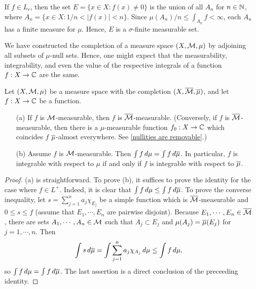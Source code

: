 \begin{obs}
    If $f\in L_c$, then the set $E=\{x\in X: f(x)\neq 0\}$ is the union of all $A_n$ for $n\in{\mathbb{N}}$, where $A_n=\{x\in X: 1/n<|f(x)|<n\}$.
    Since $\mu(A_n)/n\leq\int_{A_n} f<\infty$, each $A_n$ has a finite measure for $\mu$.
    Hence, $E$ is a $\sigma$-finite measurable set.
\end{obs}

We have constructed the completion of a measure space $(X, {\mathcal{M}}, \mu)$ by adjoining all subsets of $\mu$-null sets.
Hence, one might expect that the measurability, integrability, and even the value of the respective integrals of a function $f: X\rightarrow{\mathbb{C}}$ are the same.
\begin{lem}\label{integral w.r.t. a measure and its completion}
    Let $(X, {\mathcal{M}}, \mu)$ be a measure space with the completion $(X, \overline{{\mathcal{M}}}, \overline{\mu})$, and let $f: X\rightarrow{\mathbb{C}}$ be a function.
    \begin{enumerate}
        \item[(a)]
        {
            If $f$ is ${\mathcal{M}}$-measurable, then $f$ is $\overline{{\mathcal{M}}}$-measurable.
            (Conversely, if $f$ is $\overline{{\mathcal{M}}}$-measurable, then there is a $\mu$-measurable function $f_0: X\rightarrow{\mathbb{C}}$ which coincides $f$ $\overline{\mu}$-almost everywhere. See \cref{nullities are removable}.)
        }
        \item[(b)]
        {
            Assume $f$ is ${\mathcal{M}}$-measurable.
            Then $\int f\,d\mu=\int f\,d\overline{\mu}$.
            In particular, $f$ is integrable with respect to $\mu$ if and only if $f$ is integrable with respect to $\overline{\mu}$.
        }
    \end{enumerate}
\end{lem}
\begin{proof}
    (a) is straightforward.
    To prove (b), it suffices to prove the identity for the case where $f\in L^+$.
    Indeed, it is clear that $\int f\,d\mu\leq \int f\,d\overline{\mu}$.
    To prove the converse inequality, let $s=\sum_{j=1}^n a_j\chi_{E_j}$ be a simple function which is $\overline{{\mathcal{M}}}$-measurable and $0\leq s\leq f$ (assume that $E_1, \cdots, E_n$ are pairwise disjoint).
    Because $E_1, \cdots, E_n\in\overline{{\mathcal{M}}}$, there are sets $A_1, \cdots, A_n\in{\mathcal{M}}$ such that $A_j\subset E_j$ and $\mu(A_j)=\overline{\mu}(E_j)$ for $j=1, \cdots, n$.
    Then
    \begin{align*}
        \int s\,d\overline{\mu} = \int\sum_{j=1}^n a_j\chi_{A_j}\,d\mu\leq\int f\,d\mu,
    \end{align*}
    so $\int f\,d\mu=\int f\,d\overline{\mu}$.
    The last assertion is a direct conclusion of the preceeding identity.
\end{proof}

